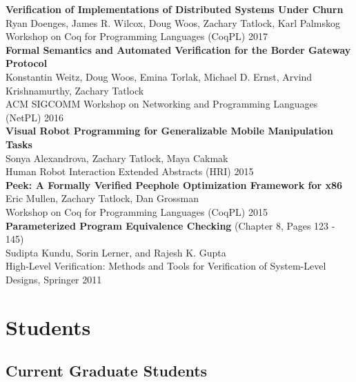 \documentclass[10pt]{article}
\begin{document}
\textbf{%
Verification of Implementations of Distributed Systems Under Churn
} \\
Ryan Doenges, James R. Wilcox, Doug Woos, Zachary Tatlock, Karl Palmskog \\
Workshop on Coq for Programming Languages (CoqPL) 2017 \\

\textbf{%
Formal Semantics and Automated Verification for the Border Gateway Protocol
} \\
Konstantin Weitz, Doug Woos, Emina Torlak, Michael D. Ernst, Arvind Krishnamurthy, Zachary Tatlock \\
ACM SIGCOMM Workshop on Networking and Programming Languages (NetPL) 2016 \\

\textbf{%
Visual Robot Programming for Generalizable Mobile Manipulation Tasks
} \\
Sonya Alexandrova, Zachary Tatlock, Maya Cakmak \\
Human Robot Interaction Extended Abstracts (HRI) 2015 \\

\textbf{%
Peek: A Formally Verified Peephole Optimization Framework for x86
} \\
Eric Mullen, Zachary Tatlock, Dan Grossman \\
Workshop on Coq for Programming Languages (CoqPL) 2015 \\

\textbf{%
Parameterized Program Equivalence Checking
} (Chapter 8, Pages 123 - 145) \\
Sudipta Kundu, Sorin Lerner, and Rajesh K. Gupta \\
High-Level Verification: Methods and Tools for Verification of System-Level Designs, Springer 2011


\section*{Students}

\subsection*{Current Graduate Students}
\end{document}
